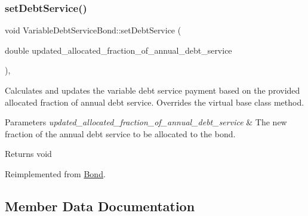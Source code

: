 \mbox{\label{classVariableDebtServiceBond_a692563150053b280f6e1ef23fd47c117}} 
\subsubsection{\texorpdfstring{set\+Debt\+Service()}{setDebtService()}}
{\footnotesize\ttfamily void Variable\+Debt\+Service\+Bond\+::set\+Debt\+Service (\begin{DoxyParamCaption}\item[{double}]{updated\+\_\+allocated\+\_\+fraction\+\_\+of\+\_\+annual\+\_\+debt\+\_\+service }\end{DoxyParamCaption})\hspace{0.3cm}{\ttfamily [override]}, {\ttfamily [virtual]}}



Calculates and updates the variable debt service payment based on the provided allocated fraction of annual debt service. Overrides the virtual base class method. 


\begin{DoxyParams}{Parameters}
{\em updated\+\_\+allocated\+\_\+fraction\+\_\+of\+\_\+annual\+\_\+debt\+\_\+service} & The new fraction of the annual debt service to be allocated to the bond.\\
\hline
\end{DoxyParams}
\begin{DoxyReturn}{Returns}
void 
\end{DoxyReturn}


Reimplemented from \mbox{\hyperlink{classBond_aff7fc4e1edcf199fb592d22c765b854e}{Bond}}.



\subsection{Member Data Documentation}
\mbox{\label{classVariableDebtServiceBond_a24b333de66efd610ef5d94a673250ff9}} 
